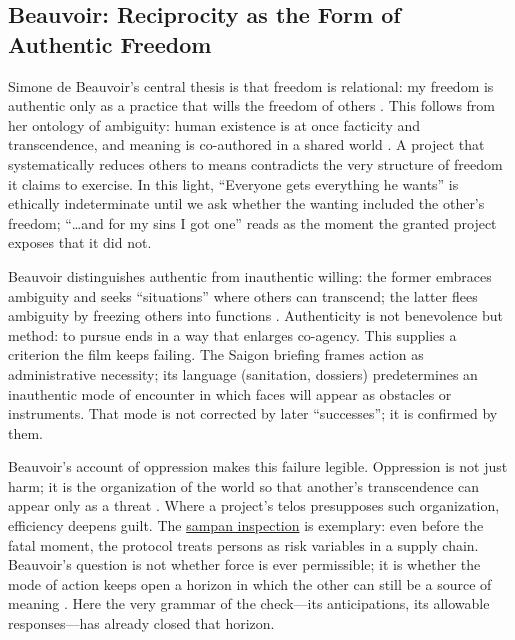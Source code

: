\subsection*{Beauvoir: Reciprocity as the Form of Authentic Freedom}
\label{ssec:iii-beauvoir}
Simone de Beauvoir's central thesis is that freedom is relational: my freedom is authentic only as a
practice that wills the freedom of others \parencite[p.~73]{Beauvoir1976}. This follows from
her ontology of ambiguity: human existence is at once facticity and transcendence, and meaning
is co-authored in a shared world \parencite[pp.~9--14, 24--30]{Beauvoir1976}. A project that
systematically reduces others to means contradicts the very structure of freedom it claims to
exercise. In this light, ``Everyone gets everything he wants'' is ethically indeterminate until
we ask whether the wanting included the other's freedom; ``\ldots and for my sins I got one''
reads as the moment the granted project exposes that it did not.

Beauvoir distinguishes authentic from inauthentic willing: the former embraces ambiguity and
seeks ``situations'' where others can transcend; the latter flees ambiguity by freezing others
into functions \parencite[pp.~70--76, 134--145]{Beauvoir1976}. Authenticity is not benevolence
but method: to pursue ends in a way that enlarges co-agency. This supplies a criterion the film
keeps failing. The Saigon briefing frames action as administrative necessity; its language
(sanitation, dossiers) predetermines an inauthentic mode of encounter in which faces will appear
as obstacles or instruments. That mode is not corrected by later ``successes''; it is confirmed
by them.

Beauvoir's account of oppression makes this failure legible. Oppression is not just harm; it is
the organization of the world so that another's transcendence can appear only as a threat
\parencite[pp.~85--91, 157--161]{Beauvoir1976}. Where a project's telos presupposes such
organization, efficiency deepens guilt. The \hyperref[scene:sampan]{sampan inspection} is
exemplary: even before the fatal moment, the protocol treats persons as risk variables in a
supply chain. Beauvoir's
question is not whether force is ever permissible; it is whether the mode of action keeps open
a horizon in which the other can still be a source of meaning
\parencite[pp.~139--147, 164--173]{Beauvoir1976}. Here the very grammar of the check—its
anticipations, its allowable responses—has already closed that horizon.

